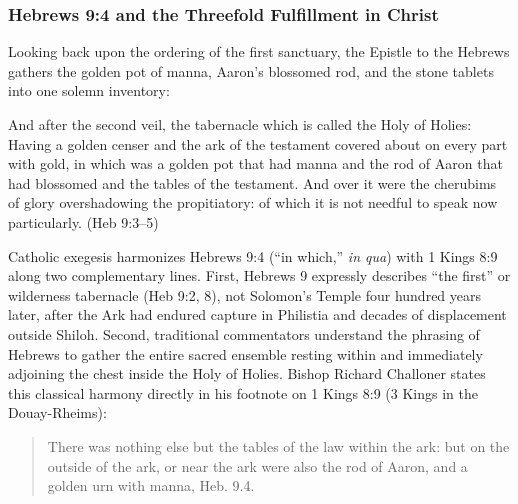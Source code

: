 \subsubsection{Hebrews 9:4 and the Threefold Fulfillment in Christ}

Looking back upon the ordering of the first sanctuary, the Epistle to the Hebrews gathers the golden pot of manna, Aaron's blossomed rod, and the stone tablets into one solemn inventory:

\begin{scriptureblock}
And after the second veil, the tabernacle which is called the Holy of Holies: Having a golden censer and the ark of the testament covered about on every part with gold, in which was a golden pot that had manna and the rod of Aaron that had blossomed and the tables of the testament. And over it were the cherubims of glory overshadowing the propitiatory: of which it is not needful to speak now particularly. \textnormal{(Heb 9:3--5)}
\end{scriptureblock}

Catholic exegesis harmonizes Hebrews 9:4 (``in which,'' \textit{in qua}) with 1 Kings 8:9 along two complementary lines. First, Hebrews 9 expressly describes ``the first'' or wilderness tabernacle (Heb 9:2, 8), not Solomon's Temple four hundred years later, after the Ark had endured capture in Philistia and decades of displacement outside Shiloh. Second, traditional commentators understand the phrasing of Hebrews to gather the entire sacred ensemble resting within and immediately adjoining the chest inside the Holy of Holies. Bishop Richard Challoner states this classical harmony directly in his footnote on 1 Kings 8:9 (3 Kings in the Douay-Rheims):

\begin{quote}\small
There was nothing else but the tables of the law within the ark: but on the outside of the ark, or near the ark were also the rod of Aaron, and a golden urn with manna, Heb. 9.4.
\end{quote}


